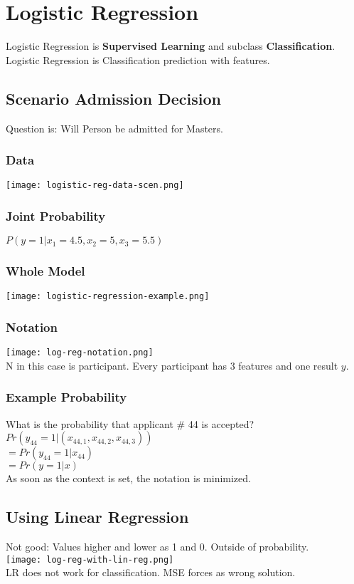 \section{Logistic Regression}
Logistic Regression is \textbf{Supervised Learning} and subclass \textbf{Classification}.
Logistic Regression is Classification prediction with features.
\subsection{Scenario Admission Decision}
Question is: Will Person be admitted for Masters.
\subsubsection{Data}
\texttt{[image: logistic-reg-data-scen.png]}\\
\subsubsection{Joint Probability}
$P(y =1 | x_1 = 4.5, x_2 = 5, x_3 = 5.5)$
\subsubsection{Whole Model}
\texttt{[image: logistic-regression-example.png]}
\subsubsection{Notation}
\texttt{[image: log-reg-notation.png]}\\
N in this case is participant.
Every participant has 3 features and one result $y$.

\subsubsection{Example Probability}
What is the probability that applicant \# 44 is accepted?\\
$Pr(y_{44} = 1 | (x_{44,1},x_{44,2},x_{44,3})) $\\
$ = Pr(y_{44} = 1 | x_{44})$\\
$ = Pr(y = 1 | x)$\\
As soon as the context is set, the notation is minimized.

\subsection{Using Linear Regression}
Not good: Values higher and lower as 1 and 0. Outside of probability.\\
\texttt{[image: log-reg-with-lin-reg.png]}\\
LR does not work for classification.
MSE forces as wrong solution.

